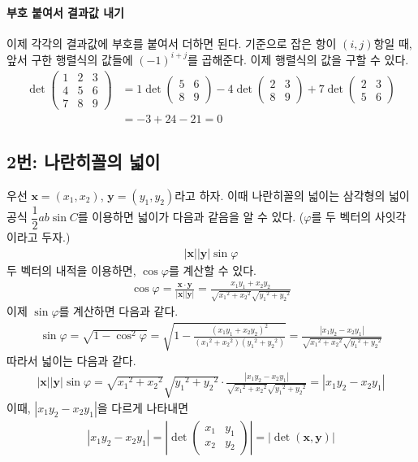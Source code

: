 \paragraph{부호 붙여서 결과값 내기} 이제 각각의 결과값에 부호를 붙여서 더하면 된다. 기준으로 잡은 항이 $(i, j)$항일 때, 앞서 구한 행렬식의 값들에 $(-1)^{i+j}$를 곱해준다. 이제 행렬식의 값을 구할 수 있다.
\begin{align*}
\det\begin{pmatrix}
1 & 2 & 3\\
4 & 5 & 6\\
7 & 8 & 9
\end{pmatrix}&=1\det\begin{pmatrix}
5 & 6\\
8 & 9
\end{pmatrix}-4\det\begin{pmatrix}
2 & 3\\
8 & 9
\end{pmatrix}+7\det\begin{pmatrix}
2 & 3\\
5 & 6
\end{pmatrix}\\
&=-3+24-21=0
\end{align*}

\subsection{2번: 나란히꼴의 넓이}
우선 $\mathbf{x}=(x_1, x_2)$, $\mathbf{y}=(y_1, y_2)$라고 하자. 이때 나란히꼴의 넓이는 삼각형의 넓이 공식 $\dfrac{1}{2}ab\sin C$를 이용하면 넓이가 다음과 같음을 알 수 있다. ($\varphi$를 두 벡터의 사잇각이라고 두자.)
\begin{align*}
|\mathbf{x}||\mathbf{y}|\sin\varphi
\end{align*}
두 벡터의 내적을 이용하면, $\cos\varphi$를 계산할 수 있다.
\begin{align*}
\cos\varphi=\frac{\mathbf{x}\cdot\mathbf{y}}{|\mathbf{x}||\mathbf{y}|}=\frac{x_1y_1+x_2y_2}{\sqrt{{x_1}^2+{x_2}^2}\sqrt{{y_1}^2+{y_2}^2}}
\end{align*}
이제 $\sin\varphi$를 계산하면 다음과 같다.
\begin{align*}
\sin\varphi=\sqrt{1-\cos^2\varphi}=\sqrt{1-\frac{(x_1y_1+x_2y_2)^2}{({x_1}^2+{x_2}^2)({y_1}^2+{y_2}^2)}}=\frac{|x_1y_2-x_2y_1|}{\sqrt{{x_1}^2+{x_2}^2}\sqrt{{y_1}^2+{y_2}^2}}
\end{align*}
따라서 넓이는 다음과 같다.
\begin{align*}
|\mathbf{x}||\mathbf{y}|\sin\varphi=\sqrt{{x_1}^2+{x_2}^2}\sqrt{{y_1}^2+{y_2}^2}\cdot \frac{|x_1y_2-x_2y_1|}{\sqrt{{x_1}^2+{x_2}^2}\sqrt{{y_1}^2+{y_2}^2}}=|x_1y_2-x_2y_1|
\end{align*}
이때, $|x_1y_2-x_2y_1|$을 다르게 나타내면
\begin{align*}
|x_1y_2-x_2y_1|=\left|\det\begin{pmatrix}
x_1 & y_1\\
x_2 & y_2
\end{pmatrix}\right|=|\det(\mathbf{x}, \mathbf{y})|
\end{align*}

